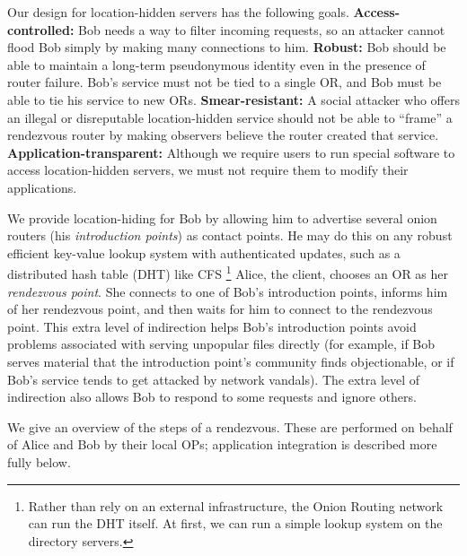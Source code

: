 \documentclass[times,10pt,twocolumn]{article}
\begin{document}
Our design for location-hidden servers has the following goals.
\textbf{Access-controlled:} Bob needs a way to filter incoming requests,
so an attacker cannot flood Bob simply by making many connections to him.
\textbf{Robust:} Bob should be able to maintain a long-term pseudonymous
identity even in the presence of router failure. Bob's service must
not be tied to a single OR, and Bob must be able to tie his service
to new ORs. \textbf{Smear-resistant:}
A social attacker who offers an illegal or disreputable location-hidden
service should not be able to ``frame'' a rendezvous router by 
making observers believe the router created that service.
\textbf{Application-transparent:} Although we require users
to run special software to access location-hidden servers, we must not
require them to modify their applications.

We provide location-hiding for Bob by allowing him to advertise
several onion routers (his \emph{introduction points}) as contact
points. He may do this on any robust efficient
key-value lookup system with authenticated updates, such as a
distributed hash table (DHT) like CFS \cite{cfs:sosp01}\footnote{
Rather than rely on an external infrastructure, the Onion Routing network
can run the DHT itself.  At first, we can run a simple lookup
system on the
directory servers.} Alice, the client, chooses an OR as her
\emph{rendezvous point}. She connects to one of Bob's introduction
points, informs him of her rendezvous point, and then waits for him
to connect to the rendezvous point. This extra level of indirection
helps Bob's introduction points avoid problems associated with serving
unpopular files directly (for example, if Bob serves
material that the introduction point's community finds objectionable,
or if Bob's service tends to get attacked by network vandals).
The extra level of indirection also allows Bob to respond to some requests
and ignore others.

We give an overview of the steps of a rendezvous. These are
performed on behalf of Alice and Bob by their local OPs;
application integration is described more fully below.
\end{document}
